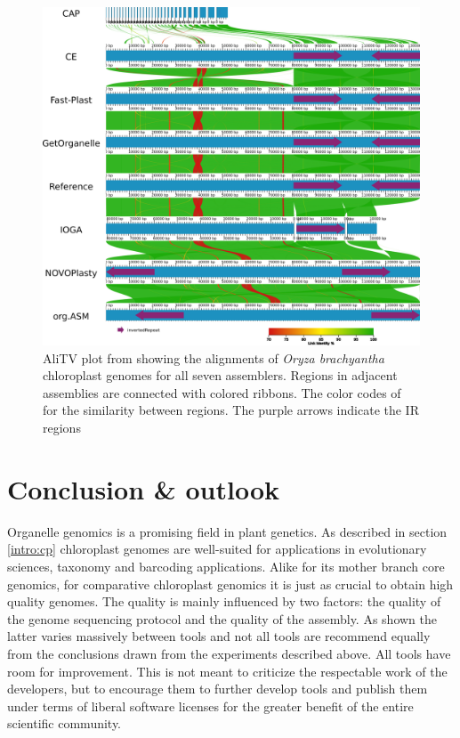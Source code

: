 \begin{figure}[H]
  \centering \includegraphics[height=.60\textheight, width=.99\textwidth]{Figures/AliTV.png} \decoRule
  \caption[AliTV plot of alignments of assemblies of \textit{Oryza brachyantha} of all
  assemblers]{ AliTV plot \cite{alitv} from \cite{freudenthal2019landscape} showing the
    alignments of \textit{Oryza brachyantha} chloroplast genomes for all seven
    assemblers. Regions in adjacent assemblies are connected with colored ribbons. The
    color codes of for the similarity between regions. The purple arrows indicate the IR
    regions}
\label{fig:alitv}
\end{figure}

\section{Conclusion \& outlook}

Organelle genomics is a promising field in plant genetics. As described in section
\ref{intro:cp} chloroplast genomes are well-suited for applications in evolutionary
sciences, taxonomy and barcoding applications. Alike for its mother branch core genomics,
for comparative chloroplast genomics it is just as crucial to obtain high quality
genomes. The quality is mainly influenced by two factors: the quality of the genome
sequencing protocol and the quality of the assembly. As shown the latter varies massively
between tools and not all tools are recommend equally from the conclusions drawn from the
experiments described above. All tools have room for improvement. This is not meant to
criticize the respectable work of the developers, but to encourage them to further develop
tools and publish them under terms of liberal software licenses for the greater benefit of
the entire scientific community.
